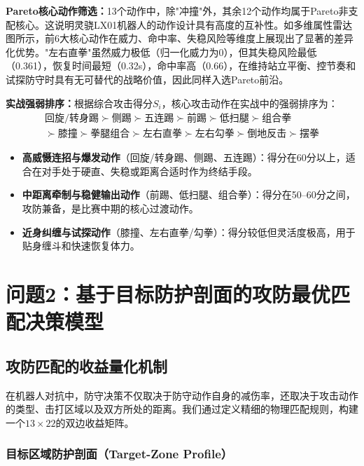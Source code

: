 \documentclass[a4paper,12pt]{article}
\numberwithin{equation}{section}
\numberwithin{table}{section}
\numberwithin{figure}{section}
\begin{document}
\textbf{Pareto核心动作筛选：}13个动作中，除"冲撞"外，其余12个动作均属于Pareto非支配核心。这说明灵骁LX01机器人的动作设计具有高度的互补性。如多维属性雷达图所示，前6大核心动作在威力、命中率、失稳风险等维度上展现出了显著的差异化优势。"左右直拳"虽然威力极低（归一化威力为0），但其失稳风险最低（0.361），恢复时间最短（0.32s），命中率高（0.66），在维持站立平衡、控节奏和试探防守时具有无可替代的战略价值，因此同样入选Pareto前沿。

\textbf{实战强弱排序：}根据综合攻击得分$S_i$，核心攻击动作在实战中的强弱排序为：
\begin{equation}
    \begin{aligned}
        \text{回旋/转身踢} \succ \text{侧踢} \succ \text{五连踢} \succ \text{前踢} \succ \text{低扫腿} \succ \text{组合拳} \\
        \succ \text{膝撞} \succ \text{拳腿组合} \succ \text{左右直拳} \succ \text{左右勾拳} \succ \text{倒地反击} \succ \text{摆拳}
    \end{aligned}
    \label{eq:ranking}
\end{equation}
\begin{itemize}
    \item \textbf{高威慑连招与爆发动作}（回旋/转身踢、侧踢、五连踢）：得分在60分以上，适合在对手处于硬直、失稳或距离合适时作为终结手段。
    \item \textbf{中距离牵制与稳健输出动作}（前踢、低扫腿、组合拳）：得分在50--60分之间，攻防兼备，是比赛中期的核心过渡动作。
    \item \textbf{近身纠缠与试探动作}（膝撞、左右直拳/勾拳）：得分较低但灵活度极高，用于贴身缠斗和快速恢复体力。
\end{itemize}

\section{问题2：基于目标防护剖面的攻防最优匹配决策模型}

\subsection{攻防匹配的收益量化机制}

在机器人对抗中，防守决策不仅取决于防守动作自身的减伤率，还取决于攻击动作的类型、击打区域以及双方所处的距离。我们通过定义精细的物理匹配规则，构建一个$13 \times 22$的双边收益矩阵。

\subsubsection{目标区域防护剖面（Target-Zone Profile）}
\end{document}
